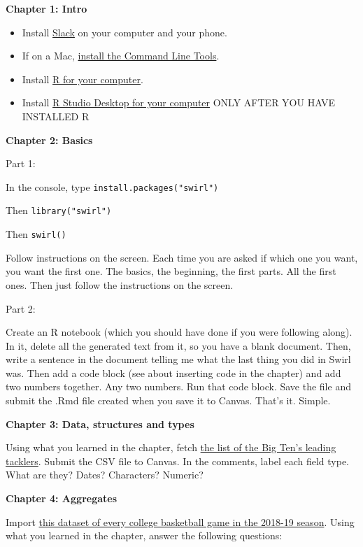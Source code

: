 \documentclass[]{book}
\providecommand{\tightlist}{%
  \setlength{\itemsep}{0pt}\setlength{\parskip}{0pt}}
\begin{document}
\textbf{Chapter 1: Intro}

\begin{itemize}
\tightlist
\item
  Install \href{https://slack.com/get}{Slack} on your computer and your phone.
\item
  If on a Mac, \href{http://osxdaily.com/2014/02/12/install-command-line-tools-mac-os-x/}{install the Command Line Tools}.
\item
  Install \href{https://rweb.crmda.ku.edu/cran/}{R for your computer}.
\item
  Install \href{https://www.rstudio.com/products/rstudio/download/\#download}{R Studio Desktop for your computer} ONLY AFTER YOU HAVE INSTALLED R
\end{itemize}

\textbf{Chapter 2: Basics}

Part 1:

In the console, type \texttt{install.packages("swirl")}

Then \texttt{library("swirl")}

Then \texttt{swirl()}

Follow instructions on the screen. Each time you are asked if which one you want, you want the first one. The basics, the beginning, the first parts. All the first ones. Then just follow the instructions on the screen.

Part 2:

Create an R notebook (which you should have done if you were following along). In it, delete all the generated text from it, so you have a blank document. Then, write a sentence in the document telling me what the last thing you did in Swirl was. Then add a code block (see about inserting code in the chapter) and add two numbers together. Any two numbers. Run that code block. Save the file and submit the .Rmd file created when you save it to Canvas. That's it. Simple.

\textbf{Chapter 3: Data, structures and types}

Using what you learned in the chapter, fetch \href{http://www.cfbstats.com/2018/leader/827/player/split01/category19/sort01.html}{the list of the Big Ten's leading tacklers}. Submit the CSV file to Canvas. In the comments, label each field type. What are they? Dates? Characters? Numeric?

\textbf{Chapter 4: Aggregates}

Import \href{https://unl.box.com/s/a8m91bro10t89watsyo13yjegb1fy009}{this dataset of every college basketball game in the 2018-19 season}. Using what you learned in the chapter, answer the following questions:
\end{document}
